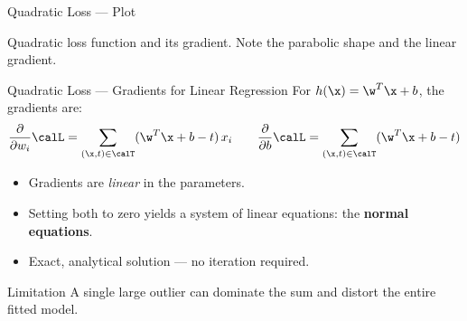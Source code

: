 \begin{frame}{Quadratic Loss — Plot}
  \begin{center}
  \end{center}
  \vspace{-0.3em}
  {\small Quadratic loss function and its gradient.
  Note the parabolic shape and the linear gradient.}
\end{frame}

\begin{frame}{Quadratic Loss — Gradients for Linear Regression}
  For $h(\x) = \w^T\x + b$, the gradients are:
  \[
    \frac{\partial}{\partial w_i}\calL =
    \sum_{(\x,t)\in\calT}(\w^T\x+b-t)\,x_i
    \qquad
    \frac{\partial}{\partial b}\calL =
    \sum_{(\x,t)\in\calT}(\w^T\x+b-t)
  \]

  \begin{itemize}
    \item Gradients are \emph{linear} in the parameters.
    \item Setting both to zero yields a system of linear equations: the \textbf{normal equations}.
    \item Exact, analytical solution — no iteration required.
  \end{itemize}

  \vspace{.4em}
  \begin{alertblock}{Limitation}
    A single large outlier can dominate the sum and distort the entire fitted model.
  \end{alertblock}
\end{frame}

